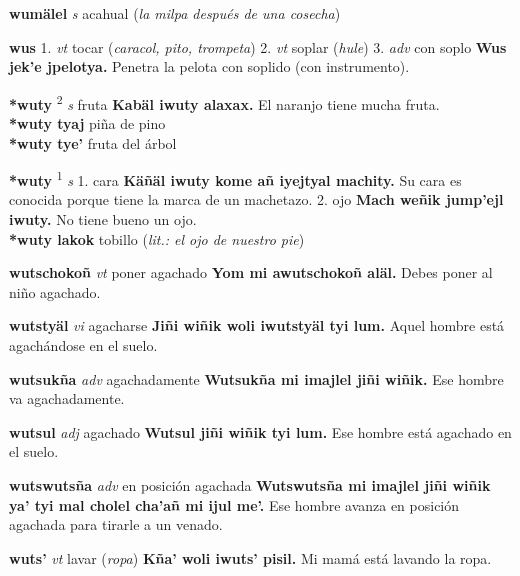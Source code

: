 \documentclass[10pt]{scrbook}
\newcommand{\entry}[1]{\textbf{#1}}
\newcommand{\onedefinition}[1]{#1.}
\newcommand{\defsuperscript}[1]{\textsuperscript{#1}}
\newcommand{\partofspeech}[1]{\textit{#1}}
\newcommand{\spanishtranslation}[1]{#1}
\newcommand{\clarification}[1]{(\textit{#1})}
\newcommand{\cholexample}[1]{\textbf{#1}}
\newcommand{\exampletranslation}[1]{#1}
\newcommand{\secondaryentry}[1]{\\\textbf{#1}}
\newcommand{\secondtranslation}[1]{#1}
\begin{document}
\begin{multicols}{2}
\entry{wumälel}
\partofspeech{s}
\spanishtranslation{acahual}
\clarification{la milpa después de una cosecha}

\entry{wus}
\onedefinition{1}
\partofspeech{vt}
\spanishtranslation{tocar}
\clarification{caracol, pito, trompeta}
\onedefinition{2}
\partofspeech{vt}
\spanishtranslation{soplar}
\clarification{hule}
\onedefinition{3}
\partofspeech{adv}
\spanishtranslation{con soplo}
\cholexample{Wus jek'e jpelotya.}
\exampletranslation{Penetra la pelota con soplido (con instrumento).}

\entry{*wuty}
\defsuperscript{2}
\partofspeech{s}
\spanishtranslation{fruta}
\cholexample{Kabäl iwuty alaxax.}
\exampletranslation{El naranjo tiene mucha fruta.}
\secondaryentry{*wuty tyaj}
\secondtranslation{piña de pino}
\secondaryentry{*wuty tye'}
\secondtranslation{fruta del árbol}

\entry{*wuty}
\defsuperscript{1}
\partofspeech{s}
\onedefinition{1}
\spanishtranslation{cara}
\cholexample{Käñäl iwuty kome añ iyejtyal machity.}
\exampletranslation{Su cara es conocida porque tiene la marca de un machetazo.}
\onedefinition{2}
\spanishtranslation{ojo}
\cholexample{Mach weñik jump'ejl iwuty.}
\exampletranslation{No tiene bueno un ojo.}
\secondaryentry{*wuty lakok}
\secondtranslation{tobillo}
\clarification{lit.: el ojo de nuestro pie}

\entry{wutschokoñ}
\partofspeech{vt}
\spanishtranslation{poner agachado}
\cholexample{Yom mi awutschokoñ aläl.}
\exampletranslation{Debes poner al niño agachado.}

\entry{wutstyäl}
\partofspeech{vi}
\spanishtranslation{agacharse}
\cholexample{Jiñi wiñik woli iwutstyäl tyi lum.}
\exampletranslation{Aquel hombre está agachándose en el suelo.}

\entry{wutsukña}
\partofspeech{adv}
\spanishtranslation{agachadamente}
\cholexample{Wutsukña mi imajlel jiñi wiñik.}
\exampletranslation{Ese hombre va agachadamente.}

\entry{wutsul}
\partofspeech{adj}
\spanishtranslation{agachado}
\cholexample{Wutsul jiñi wiñik tyi lum.}
\exampletranslation{Ese hombre está agachado en el suelo.}

\entry{wutswutsña}
\partofspeech{adv}
\spanishtranslation{en posición agachada}
\cholexample{Wutswutsña mi imajlel jiñi wiñik ya' tyi mal cholel cha'añ mi ijul me'.}
\exampletranslation{Ese hombre avanza en posición agachada para tirarle a un venado.}

\entry{wuts'}
\partofspeech{vt}
\spanishtranslation{lavar}
\clarification{ropa}
\cholexample{Kña' woli iwuts' pisil.}
\exampletranslation{Mi mamá está lavando la ropa.}


\end{multicols}
\end{document}
